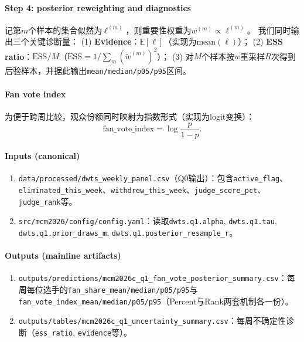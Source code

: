 \paragraph{Step 4: posterior reweighting and diagnostics}
记第$m$个样本的集合似然为$\ell^{(m)}$，则重要性权重为$w^{(m)}\propto \ell^{(m)}$。
我们同时输出三个关键诊断量：
(1) \textbf{Evidence}：$\mathbb{E}[\ell]$（实现为$\mathrm{mean}(\ell)$）；
(2) \textbf{ESS ratio}：$\mathrm{ESS}/M$（$\mathrm{ESS}=1/\sum_m (\tilde w^{(m)})^2$）；
(3) 对$M$个样本按$w$重采样$R$次得到后验样本，并据此输出\texttt{mean/median/p05/p95}区间。

\paragraph{Fan vote index}
为便于跨周比较，观众份额同时映射为指数形式（实现为logit变换）：
\begin{equation}
\mathrm{fan\_vote\_index} = \log\frac{p}{1-p}.
\end{equation}

\paragraph{Inputs (canonical)}
\begin{enumerate}[label=(\arabic*),leftmargin=2.4em]
    \item \texttt{data/processed/dwts\_weekly\_panel.csv}（Q0输出）：包含\texttt{active\_flag}、\texttt{eliminated\_this\_week}、\texttt{withdrew\_this\_week}、\texttt{judge\_score\_pct}、\texttt{judge\_rank}等。
    \item \texttt{src/mcm2026/config/config.yaml}：读取\texttt{dwts.q1.alpha}, \texttt{dwts.q1.tau}, \texttt{dwts.q1.prior\_draws\_m}, \texttt{dwts.q1.posterior\_resample\_r}。
\end{enumerate}

\paragraph{Outputs (mainline artifacts)}
\begin{enumerate}[label=(\arabic*),leftmargin=2.4em]
    \item \texttt{outputs/predictions/mcm2026c\_q1\_fan\_vote\_posterior\_summary.csv}：每周每位选手的\texttt{fan\_share\_mean/median/p05/p95}与\texttt{fan\_vote\_index\_mean/median/p05/p95}（Percent与Rank两套机制各一份）。
    \item \texttt{outputs/tables/mcm2026c\_q1\_uncertainty\_summary.csv}：每周不确定性诊断（\texttt{ess\_ratio}, \texttt{evidence}等）。
\end{enumerate}

